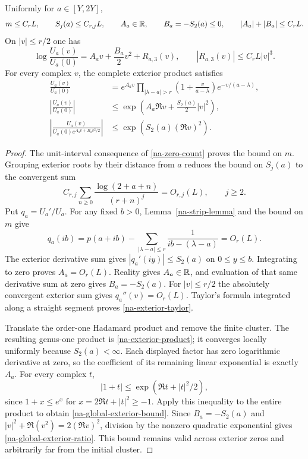 \begin{lemma}
\label{na-exterior-lemma}
Uniformly for $a\in[Y,2Y]$,
\begin{equation}
 m\le C_r L,\qquad S_j(a)\le C_{r,j}L,
 \qquad A_a\in\mathbb R,\qquad B_a=-S_2(a)\le0,
 \qquad |A_a|+|B_a|\le C_rL.
 \label{na-exterior-bounds}
\end{equation}
On $|v|\le r/2$ one has
\begin{equation}
 \log\frac{U_a(v)}{U_a(0)}
     =A_av+\frac{B_a}2v^2+R_{a,3}(v),
 \qquad |R_{a,3}(v)|\le C_rL|v|^3.
 \label{na-exterior-taylor}
\end{equation}
For every complex $v$, the complete exterior product satisfies
\begin{align}
 \frac{U_a(v)}{U_a(0)}
 &=e^{A_av}\prod_{|\lambda-a|>r}
       \left(1+\frac v{a-\lambda}\right)e^{-v/(a-\lambda)},
 \label{na-exterior-product}\\
 \left|\frac{U_a(v)}{U_a(0)}\right|
 &\le \exp\left(A_a\Re v+\frac{S_2(a)}2|v|^2\right),
 \label{na-global-exterior-bound}\\
 \left|\frac{U_a(v)}{U_a(0)e^{A_av+B_av^2/2}}\right|
 &\le \exp\left(S_2(a)(\Re v)^2\right).
 \label{na-global-exterior-ratio}
\end{align}
\end{lemma}
\begin{proof}
The unit-interval consequence of \eqref{na-zero-count} proves the
bound on $m$. Grouping exterior roots by their distance from $a$
reduces the bound on $S_j(a)$ to the convergent sum
\[
 C_{r,j}\sum_{n\ge0}
       \frac{\log(2+a+n)}{(r+n)^j}=O_{r,j}(L),\qquad j\ge2.
\]
Put $q_a=U_a'/U_a$. For any fixed $b>0$, Lemma~\ref{na-strip-lemma}
and the bound on $m$ give
\[
 q_a(ib)=p(a+ib)-\sum_{|\lambda-a|\le r}
                 \frac1{ib-(\lambda-a)}=O_r(L).
\]
The exterior derivative sum gives $|q_a'(iy)|\le S_2(a)$ on
$0\le y\le b$. Integrating to zero proves $A_a=O_r(L)$.
Reality gives $A_a\in\mathbb R$, and evaluation of that same derivative
sum at zero gives $B_a=-S_2(a)$. For $|v|\le r/2$ the absolutely
convergent exterior sum gives $q_a''(v)=O_r(L)$.
Taylor's formula integrated along a straight segment proves
\eqref{na-exterior-taylor}.

Translate the order-one Hadamard product and remove the finite cluster.
The resulting genus-one product is \eqref{na-exterior-product}; it
converges locally uniformly because $S_2(a)<\infty$. Each displayed
factor has zero logarithmic derivative at zero, so the coefficient
of its remaining linear exponential is exactly $A_a$.
For every complex $t$,
\[
 |1+t|\le\exp(\Re t+|t|^2/2),
\]
since $1+x\le e^x$ for $x=2\Re t+|t|^2\ge-1$.
Apply this inequality to the entire product to obtain
\eqref{na-global-exterior-bound}. Since $B_a=-S_2(a)$ and
$|v|^2+\Re(v^2)=2(\Re v)^2$, division by the nonzero quadratic
exponential gives \eqref{na-global-exterior-ratio}.
This bound remains valid across exterior zeros and arbitrarily far
from the initial cluster.
\end{proof}

